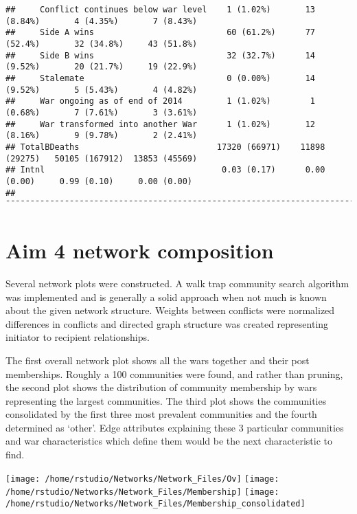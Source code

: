 \documentclass[
]{article}
\begin{document}
\begin{verbatim}
##     Conflict continues below war level    1 (1.02%)       13 (8.84%)       4 (4.35%)       7 (8.43%)   
##     Side A wins                           60 (61.2%)      77 (52.4%)       32 (34.8%)     43 (51.8%)   
##     Side B wins                           32 (32.7%)      14 (9.52%)       20 (21.7%)     19 (22.9%)   
##     Stalemate                             0 (0.00%)       14 (9.52%)       5 (5.43%)       4 (4.82%)   
##     War ongoing as of end of 2014         1 (1.02%)        1 (0.68%)       7 (7.61%)       3 (3.61%)   
##     War transformed into another War      1 (1.02%)       12 (8.16%)       9 (9.78%)       2 (2.41%)   
## TotalBDeaths                            17320 (66971)    11898 (29275)   50105 (167912)  13853 (45569) 
## Intnl                                    0.03 (0.17)      0.00 (0.00)     0.99 (0.10)     0.00 (0.00)  
## ¯¯¯¯¯¯¯¯¯¯¯¯¯¯¯¯¯¯¯¯¯¯¯¯¯¯¯¯¯¯¯¯¯¯¯¯¯¯¯¯¯¯¯¯¯¯¯¯¯¯¯¯¯¯¯¯¯¯¯¯¯¯¯¯¯¯¯¯¯¯¯¯¯¯¯¯¯¯¯¯¯¯¯¯¯¯¯¯¯¯¯¯¯¯¯¯¯¯¯¯¯¯
\end{verbatim}

\hypertarget{aim-4-network-composition}{%
\section{Aim 4 network composition}\label{aim-4-network-composition}}

Several network plots were constructed. A walk trap community search
algorithm was implemented and is generally a solid approach when not
much is known about the given network structure. Weights between
conflicts were normalized differences in conflicts and directed graph
structure was created representing initiator to recipient relationships.

The first overall network plot shows all the wars together and their
post memberships. Roughly a 100 communities were found, and rather than
pruning, the second plot shows the distribution of community membership
by wars representing the largest communities. The third plot shows the
communities consolidated by the first three most prevalent communities
and the fourth determined as `other'. Edge attributes explaining these 3
particular communities and war characteristics which define them would
be the next characteristic to find.

\texttt{[image: /home/rstudio/Networks/Network\_Files/Ov]}
\texttt{[image: /home/rstudio/Networks/Network\_Files/Membership]}
\texttt{[image: /home/rstudio/Networks/Network\_Files/Membership\_consolidated]}
\end{document}
